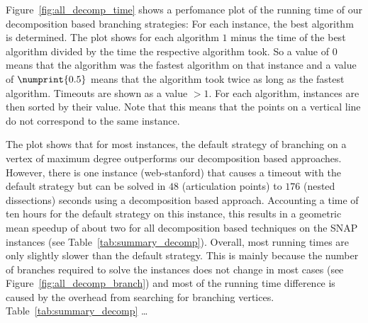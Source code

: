 \documentclass[a4paper,UKenglish,cleveref, autoref, thm-restate]{lipics-v2021}
\begin{document}
Figure~\ref{fig:all_decomp_time} shows a perfomance plot of the running time of
our decomposition based branching strategies: For each instance, the best
algorithm is determined. The plot shows for each algorithm $1$ minus the time of the best algorithm
divided by the time the respective algorithm took. So a value of $0$ means that
the algorithm was the fastest algorithm on that instance and a value of
$\numprint{0.5}$ means that the algorithm took twice as long as the fastest
algorithm. Timeouts are shown as a value $> 1$. For each algorithm, instances
are then sorted by their value. Note that this means that the points on a
vertical line do not correspond to the same instance.

The plot shows that for most instances, the default strategy of branching on a
vertex of maximum degree outperforms our decomposition based approaches.
However, there is one instance (web-stanford) that causes a timeout with the
default strategy but can be solved in $48$ (articulation points) to $176$ (nested
dissections) seconds using a decomposition based approach. Accounting a time of
ten hours for the default strategy on this instance, this results in a geometric mean speedup of about two for all
decomposition based techniques on the SNAP instances (see Table~\ref{tab:summary_decomp}). Overall, most running
times are only slightly slower than the default strategy. This is mainly because
the number of branches required to solve the instances does not change in most
cases (see Figure~\ref{fig:all_decomp_branch}) and most of the running time
difference is caused by the overhead from
searching for branching vertices. Table~\ref{tab:summary_decomp} \dots{}
\end{document}
